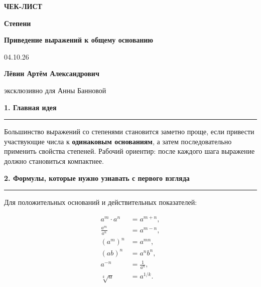 \documentclass[a4paper,12pt]{article}
\newcommand{\lessondate}{04.10.26}
\newcommand{\teacher}{Лёвин Артём Александрович}
\newcommand{\sectionline}[1]{%
  \vspace{0.65em}%
  {\large\bfseries\color{darkaccent}#1}\par
  \vspace{0.18em}\color{rulegray}\hrule\color{textgray}\vspace{0.45em}%
}
\begin{document}
\color{textgray}

\thispagestyle{empty}
\begin{center}
  \vspace*{22mm}
  {\small\color{accent}\bfseries ЧЕК-ЛИСТ}\par
  \vspace{7mm}
  {\Huge\bfseries\color{darkaccent}Степени}\par
  \vspace{4mm}
  {\Large\bfseries Приведение выражений к общему основанию}\par
  \vspace{13mm}
  {\large \lessondate}\par
  \vfill
  {\large\bfseries \teacher}\par
  \vspace{2mm}
  {\large эксклюзивно для Анны Банновой}\par
  \vspace{16mm}
  \vspace*{8mm}
\end{center}
\clearpage

\sectionline{1. Главная идея}

Большинство выражений со степенями становится заметно проще, если привести участвующие числа к \textbf{одинаковым основаниям}, а затем последовательно применить свойства степеней. Рабочий ориентир: после каждого шага выражение должно становиться компактнее.

\sectionline{2. Формулы, которые нужно узнавать с первого взгляда}

Для положительных оснований и действительных показателей:

\begin{align*}
 a^m\cdot a^n &= a^{m+n},\\
 \frac{a^m}{a^n} &= a^{m-n},\\
 \left(a^m\right)^n &= a^{mn},\\
 (ab)^n &= a^n b^n,\\
 a^{-n} &= \frac{1}{a^n},\\
 \sqrt[k]{a} &= a^{1/k}.
\end{align*}
\end{document}
